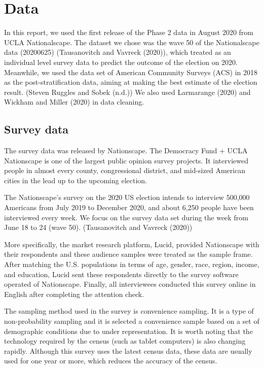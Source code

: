 \documentclass[
]{article}
\begin{document}
\hypertarget{data}{%
\section{Data}\label{data}}

In this report, we used the first release of the Phase 2 data in August
2020 from UCLA Nationalscape. The dataset we chose was the wave 50 of
the Nationalscape data (20200625) (Tausanovitch and Vavreck (2020)),
which treated as an individual level survey data to predict the outcome
of the election on 2020. Meanwhile, we used the data set of American
Community Surveys (ACS) in 2018 as the post-stratification data, aiming
at making the best estimate of the election result. (Steven Ruggles and
Sobek (n.d.)) We also used Larmarange (2020) and Wickham and Miller
(2020) in data cleaning.

\hypertarget{survey-data}{%
\subsection{Survey data}\label{survey-data}}

The survey data was released by Nationscape. The Democracy Fund + UCLA
Nationscape is one of the largest public opinion survey projects. It
interviewed people in almost every county, congressional district, and
mid-sized American cities in the lead up to the upcoming election.

The Nationscape's survey on the 2020 US election intends to interview
500,000 Americans from July 2019 to December 2020, and about 6,250
people have been interviewed every week. We focus on the survey data set
during the week from June 18 to 24 (wave 50). (Tausanovitch and Vavreck
(2020))

More specifically, the market research platform, Lucid, provided
Nationscape with their respondents and these audience samples were
treated as the sample frame. After matching the U.S. populations in
terms of age, gender, race, region, income, and education, Lucid sent
these respondents directly to the survey software operated of
Nationscape. Finally, all interviewees conducted this survey online in
English after completing the attention check.

The sampling method used in the survey is convenience sampling. It is a
type of non-probability sampling and it is selected a convenience sample
based on a set of demographic conditions due to under representation. It
is worth noting that the technology required by the census (such as
tablet computers) is also changing rapidly. Although this survey uses
the latest census data, these data are usually used for one year or
more, which reduces the accuracy of the census.
\end{document}
